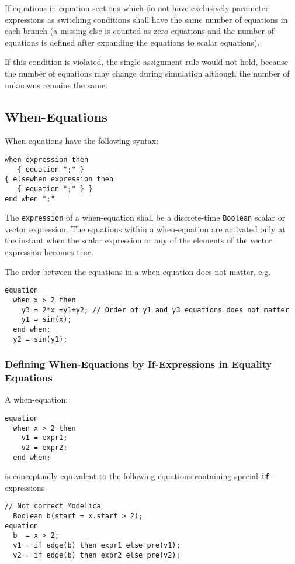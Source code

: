 If-equations in equation sections which do not have exclusively
parameter expressions as switching conditions shall have the same number
of equations in each branch (a missing else is counted as zero equations
and the number of equations is defined after expanding the equations to
scalar equations).

\begin{nonnormative}
If this condition is violated, the single assignment rule would not hold, because the number of equations may change during simulation
although the number of unknowns remains the same.
\end{nonnormative}

\subsection{When-Equations}\label{when-equations}

When-equations have the following syntax:
\begin{lstlisting}[language=grammar]
when expression then
   { equation ";" }
{ elsewhen expression then
   { equation ";" } }
end when ";"
\end{lstlisting}

The \lstinline!expression! of a when-equation shall be a discrete-time \lstinline!Boolean! scalar or vector expression.
The equations within a when-equation are activated only at the instant when the scalar expression or any of the elements of the vector expression becomes true.

\begin{example}
The order between the equations in a when-equation does not matter, e.g.
\begin{lstlisting}[language=modelica]
equation
  when x > 2 then
    y3 = 2*x +y1+y2; // Order of y1 and y3 equations does not matter
    y1 = sin(x);
  end when;
  y2 = sin(y1);
\end{lstlisting}
\end{example}

\subsubsection{Defining When-Equations by If-Expressions in Equality Equations}\label{defining-when-equations-by-if-expressions-in-equality-equations}

A when-equation:
\begin{lstlisting}[language=modelica]
equation
  when x > 2 then
    v1 = expr1;
    v2 = expr2;
  end when;
\end{lstlisting}
is conceptually equivalent to the following equations containing special \lstinline!if!-expressions
\begin{lstlisting}[language=modelica]
  // Not correct Modelica
  Boolean b(start = x.start > 2);
equation
  b  = x > 2;
  v1 = if edge(b) then expr1 else pre(v1);
  v2 = if edge(b) then expr2 else pre(v2);
\end{lstlisting}

